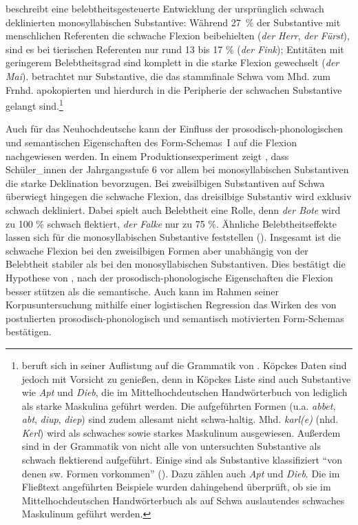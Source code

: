 \begin{sloppypar}
\textcite[114--115]{Kopcke.2000} beschreibt eine belebtheitsgesteuerte Entwicklung der ursprünglich schwach deklinierten monosyllabischen Substantive: Während 27~\% der Substantive mit menschlichen Referenten die schwache Flexion beibehielten (\textit{der Herr}, \textit{der Fürst}), sind es bei tierischen Referenten nur rund 13 bis 17 \% (\textit{der Fink}); Entitäten mit geringerem Belebtheitsgrad sind komplett in die starke Flexion gewechselt (\textit{der Mai}). \textcite[114--115]{Kopcke.2000} betrachtet nur Substantive, die das stammfinale Schwa vom Mhd. zum Frnhd. apokopierten und hierdurch in die Peripherie der schwachen Substantive gelangt sind.\footnote{\textcite[120--121]{Kopcke.2000} beruft sich in seiner Auflistung auf die Grammatik von \textcite{Paul.1917}. Köpckes Daten sind jedoch mit Vorsicht zu genießen, denn in Köpckes Liste sind auch Substantive wie \textit{Apt} und \textit{Dieb}, die im Mittelhochdeutschen Handwörterbuch von \textcite{Lexer.18721878} lediglich als starke Maskulina geführt werden. Die aufgeführten Formen (u.a. \textit{abbet}, \textit{abt}, \textit{diup}, \textit{diep}) sind zudem allesamt nicht schwa-haltig. Mhd. \textit{karl(e)} (nhd. \textit{Kerl}) wird als schwaches sowie starkes Maskulinum ausgewiesen. Außerdem sind in der Grammatik von \textcite{Paul.1917} nicht alle von \textcite{Kopcke.2000} untersuchten Substantive als schwach flektierend aufgeführt. Einige sind als Substantive klassifiziert "`von denen sw. Formen vorkommen"' (\cite[46]{Paul.1917}). Dazu zählen auch \textit{Apt} und \textit{Dieb}. Die im Fließtext angeführten Beispiele wurden dahingehend überprüft, ob sie im Mittelhochdeutschen Handwörterbuch als auf Schwa auslautendes schwaches Maskulinum geführt werden.}  
\end{sloppypar}


Auch für das Neuhochdeutsche kann der Einfluss der prosodisch-pho\-no\-lo\-gisch\-en und semantischen Eigenschaften des Form-Schemas~I auf die Flexion nachgewiesen werden. In einem Produktionsexperiment zeigt \textcite[77--78]{Kopcke.2005}, dass Schüler\_innen der Jahrgangsstufe 6 vor allem bei monosyllabischen Substantiven die starke Deklination bevorzugen. Bei zweisilbigen Substantiven auf Schwa überwiegt hingegen die schwache Flexion, das dreisilbige Substantiv wird exklusiv schwach dekliniert. Dabei spielt auch Belebtheit eine Rolle, denn \textit{der Bote} wird zu 100 \% schwach flektiert, \textit{der Falke} nur zu 75 \%. Ähnliche Belebtheitseffekte lassen sich für die monosyllabischen Substantive feststellen (\cite[77]{Kopcke.2005}). Insgesamt ist die schwache Flexion bei den zweisilbigen Formen aber unabhängig von der Belebtheit stabiler als bei den monosyllabischen Substantiven. Dies bestätigt die Hypothese von \textcite[394--396]{Schafer.2019}, nach der prosodisch-phonologische Eigenschaften die Flexion besser stützen als die semantische. Auch \textcite{Schafer.2019} kann im Rahmen seiner Korpusuntersuchung mithilfe einer logistischen Regression das Wirken des von \textcite{Kopcke.1995} postulierten prosodisch-phonologisch und semantisch motivierten Form-Schemas bestätigen.

